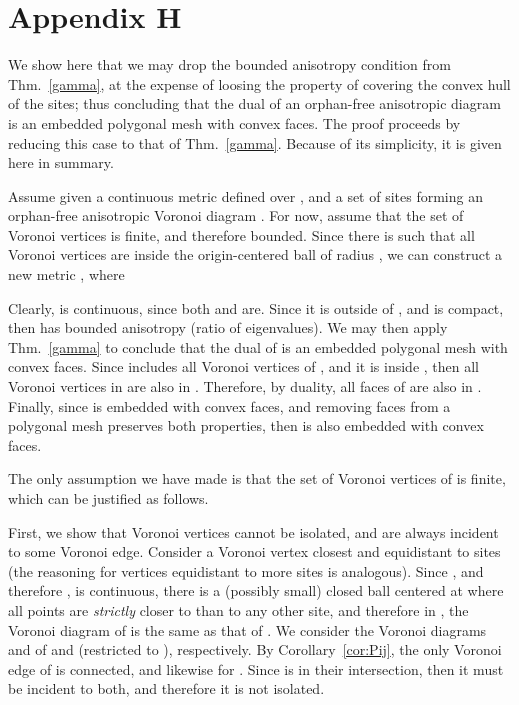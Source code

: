 \documentclass[11pt]{article}
\begin{document}
\section*{Appendix H}\label{app:noanisotropy}

We show here that we may drop the bounded anisotropy condition from Thm.~\ref{gamma}, at the expense of loosing the property of covering the convex hull of the sites; 
thus concluding that the dual of an orphan-free anisotropic diagram is an embedded polygonal mesh with convex faces. The proof proceeds by reducing this case to that of Thm.~\ref{gamma}. Because of its simplicity, it is given here in summary. 

Assume given a continuous metric  defined over , and a set  of sites forming an orphan-free anisotropic Voronoi diagram .
For now, assume that the set of Voronoi vertices is finite, and therefore bounded. 
Since there is  such that all Voronoi vertices are inside the origin-centered ball  of radius , we can construct a new metric 
, where 


Clearly,  is continuous, since both  and  are. Since it is  outside of , and  is compact, then 
 has bounded anisotropy (ratio of eigenvalues). 
We may then apply Thm.~\ref{gamma} to conclude that the dual  of  is an embedded polygonal mesh with convex faces. 
Since  includes all Voronoi vertices of , and it is  inside , then all Voronoi vertices in  are also in . 
Therefore, by duality, all faces of  are also in . Finally, since  is embedded with convex faces, 
and removing faces from a polygonal mesh preserves both properties, then  is also embedded with convex faces. 

The only assumption we have made is that the set of Voronoi vertices of  is finite,  which can be justified as follows. 



First, we show that Voronoi vertices cannot be isolated, and are always incident to some Voronoi edge. Consider a Voronoi vertex  closest and equidistant to sites  (the reasoning for vertices equidistant to more sites is analogous). 
Since , and therefore , is continuous, there is a (possibly small) closed ball  centered at  where all points are \emph{strictly} closer to  than to any other site, and therefore in , the Voronoi diagram of  is the same as that of . 
We consider the Voronoi diagrams  and  of  and  (restricted to  ), respectively. 
By Corollary~\ref{cor:Pij}, the only Voronoi edge of  is connected, and likewise for . Since  is in their intersection, then it must be incident to both, and therefore it is not isolated. 
\end{document}
